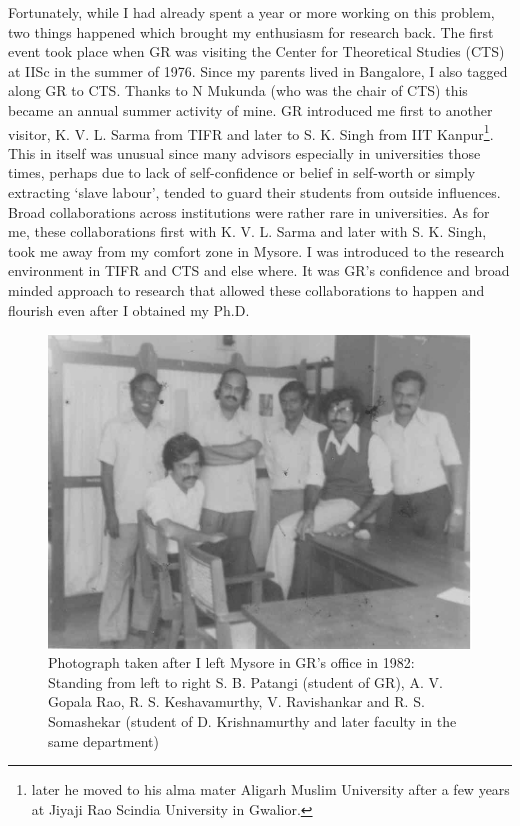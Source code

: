 Fortunately, while I had already spent a year or more working on this problem, two things happened which brought my enthusiasm for research back. The first event took place when GR was visiting the Center for Theoretical Studies (CTS) at IISc in the summer of 1976. Since my parents lived in Bangalore, I also tagged along GR to CTS. Thanks to N Mukunda (who was the chair of CTS) this became an annual summer activity of mine. GR introduced me first to another visitor, K. V. L. Sarma from TIFR and later to S. K. Singh from IIT Kanpur\footnote{later he moved to his alma mater Aligarh Muslim University after a few years at Jiyaji Rao Scindia University in Gwalior.}. This in itself was unusual since many advisors especially in universities those times, perhaps due to lack of self-confidence or belief in self-worth or simply extracting ‘slave labour’, tended to guard their students from outside influences. Broad collaborations across institutions were rather rare in universities. As for me, these collaborations first with K. V. L. Sarma and later with S. K. Singh, took me away from my comfort zone in Mysore. I was introduced to the research environment in TIFR and CTS and else where. It was GR’s confidence and broad minded approach to research that allowed these collaborations to happen and flourish even after I obtained my Ph.D.

\begin{figure}[H]
\centering
\includegraphics[scale=.85]{src/images/chap14/002.jpg}
\caption{Photograph taken after I left Mysore in GR’s office in 1982: Standing from left to right S. B. Patangi (student of GR), A. V. Gopala Rao, R. S. Keshavamurthy, V. Ravishankar and R. S. Somashekar (student of D. Krishnamurthy and later faculty in the same department)}\label{chap14-fig002}
\end{figure}

